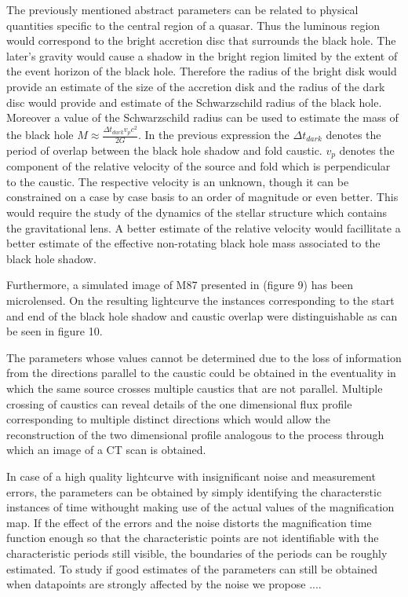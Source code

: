 The previously mentioned abstract parameters can be related to physical quantities specific to the central region of a quasar. Thus the luminous region would correspond to the bright accretion disc that surrounds the black hole. The later's gravity would cause a shadow in the bright region limited by the extent of the event horizon of the black hole. Therefore the radius of the bright disk would provide an estimate of the size of the accretion disk and the radius of the dark disc would provide and estimate of the Schwarzschild radius of the black hole. Moreover a value of the Schwarzschild radius 
can be used to estimate the mass of the black hole $M \approx \frac{\Delta t_{dark}  v_p c^2}{2G}$. In the previous 
expression the $\Delta t_{dark}$ denotes the period of overlap between the black hole shadow and fold caustic. 
$v_p$ denotes the component of the relative velocity of the source and fold which is perpendicular to the caustic.  
The respective velocity is an unknown, though it can be constrained on a case by case basis to an order of magnitude or even better. This would require the 
study of the dynamics of the stellar structure which contains the gravitational lens. A better estimate of the relative velocity would facillitate a better estimate of the effective non-rotating black hole mass associated to the black hole shadow.  


Furthermore, a simulated image of M87 presented in \citep{2012MNRAS.421.1517D} (figure 9) has been microlensed. On the resulting lightcurve the instances corresponding to the start and end of the black hole shadow and caustic overlap were distinguishable as can be seen in figure 10.
    
The parameters whose values cannot be determined due to the loss of information from the directions parallel to the 
caustic could be obtained in the eventuality in which the same source crosses multiple caustics that are not parallel. 
Multiple crossing of caustics can reveal details of the one dimensional flux profile corresponding to multiple distinct 
directions which would allow the reconstruction of the two dimensional profile analogous to the process through which an image of a CT scan is obtained.  

In case of a high quality lightcurve with insignificant noise and measurement errors, the parameters can be obtained 
by simply identifying the characterstic instances of time withought making use of the actual values of the magnification
 map. If the effect of the errors and the noise distorts the magnification time function enough so that the 
characteristic points are not identifiable with the characteristic periods still visible, the boundaries of the periods 
can be roughly estimated. To study if good estimates of the parameters can still be obtained when datapoints are
 strongly affected by the noise we propose ....        



